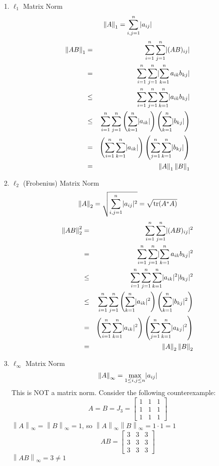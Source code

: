\documentclass[letterpaper,12pt,fleqn]{article}
\newcommand{\norm}[1]{\left\lVert#1\right\rVert}
\DeclareMathOperator{\tr}{tr}
\begin{document}
\begin{enumerate}
\item $\ell_1$ Matrix Norm
  \[\norm{A}_1=\sum_{i,j=1}^n\abs{a_{ij}}\]
  \begin{eqnarray*}
    \norm{AB}_1 &=& \sum_{i=1}^n\sum_{j=1}^n\abs{(AB)_{ij}} \\
    &=& \sum_{i=1}^n\sum_{j=1}^n\abs{\sum_{k=1}^na_{ik}b_{kj}} \\
    &\le& \sum_{i=1}^n\sum_{j=1}^n\sum_{k=1}^n\abs{a_{ik}b_{kj}} \\
    &\le& \sum_{i=1}^n\sum_{j=1}^n\left(\sum_{k=1}^n\abs{a_{ik}}\right)
    \left(\sum_{k=1}^n\abs{b_{kj}}\right) \\
    &=& \left(\sum_{i=1}^n\sum_{k=1}^n\abs{a_{ik}}\right)
    \left(\sum_{j=1}^n\sum_{k=1}^n\abs{b_{kj}}\right) \\
    &=& \norm{A}_1\norm{B}_1
  \end{eqnarray*}
\newpage
\item $\ell_2$ (Frobenius) Matrix Norm
  \[\norm{A}_2=\sqrt{\sum_{i,j=1}^n\abs{a_{ij}}^2}=\sqrt{\tr(A^*A)}\]
  \begin{eqnarray*}
    \norm{AB}_2^2 &=& \sum_{i=1}^n\sum_{j=1}^n\abs{(AB)_{ij}}^2 \\
    &=& \sum_{i=1}^n\sum_{j=1}^n\abs{\sum_{k=1}^na_{ik}b_{kj}}^2 \\
    &\le& \sum_{i=1}^n\sum_{j=1}^n\sum_{k=1}^n\abs{a_{ik}}^2\abs{b_{kj}}^2 \\
    &\le& \sum_{i=1}^n\sum_{j=1}^n\left(\sum_{k=1}^n\abs{a_{ik}}^2\right)
    \left(\sum_{k=1}^n\abs{b_{kj}}^2\right) \\
    &=& \left(\sum_{i=1}^n\sum_{k=1}^n\abs{a_{ik}}^2\right)
    \left(\sum_{j=1}^n\sum_{k=1}^n\abs{a_{kj}}^2\right) \\
    &=& \norm{A}_2\norm{B}_2
  \end{eqnarray*}

\item $\ell_{\infty}$ Matrix Norm
  \[\norm{A}_{\infty}=\max_{1\le i,j\le n}\abs{a_{ij}}\]
  This is NOT a matrix norm. Consider the following counterexample:
  \[A=B=J_3=\begin{bmatrix} 1 & 1 & 1 \\ 1 & 1 & 1 \\ 1 & 1 & 1 \end{bmatrix}\]
  $\norm{A}_{\infty}=\norm{B}_{\infty}=1$, so
  $\norm{A}_{\infty}\norm{B}_{\infty}=1\cdot1=1$
  \[AB=\begin{bmatrix} 3 & 3 & 3 \\ 3 & 3 & 3 \\ 3 & 3 & 3 \end{bmatrix}\]
  $\norm{AB}_{\infty}=3\ne1$
\end{enumerate}
\end{document}
